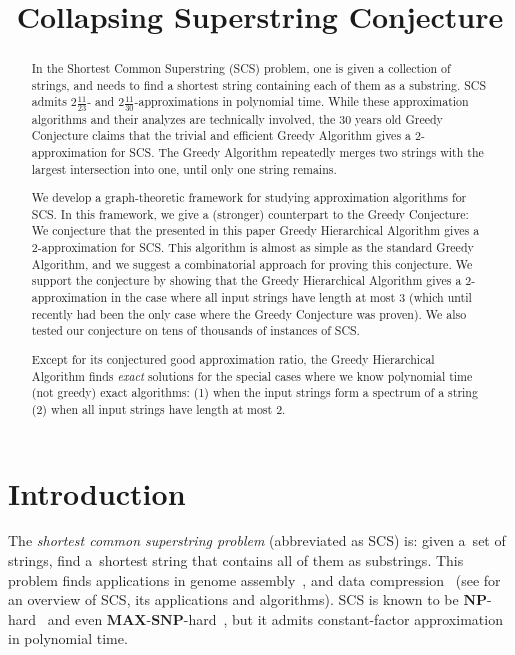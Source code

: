 \documentclass[11pt]{article}
\begin{document}
%

\sloppy
\date{}
\title{Collapsing Superstring Conjecture}
\author{}
\maketitle

\begin{abstract}
In the Shortest Common Superstring (SCS) problem, one is given a collection of strings, and needs to find a shortest string containing each of them as a substring. SCS admits $2\frac{11}{23}$- and $2\frac{11}{30}$-approximations in polynomial time. While these approximation algorithms and their analyzes are technically involved, the $30$ years old Greedy Conjecture claims that the trivial and efficient Greedy Algorithm gives a $2$-approximation for SCS. The Greedy Algorithm repeatedly merges two strings with the largest intersection into one, until only one string remains.

We develop a graph-theoretic framework for studying approximation algorithms for SCS. In this framework, we give a (stronger) counterpart to the Greedy Conjecture: We conjecture that the presented in this paper Greedy Hierarchical Algorithm gives a $2$-approximation for SCS. This algorithm is almost as simple as the standard Greedy Algorithm, and we suggest a combinatorial approach for proving this conjecture. We support the conjecture by showing that the Greedy Hierarchical Algorithm gives a $2$-approximation in the case where all input strings have length at most $3$ (which until recently had been the only case where the Greedy Conjecture was proven). We also tested our conjecture on tens of thousands of instances of SCS.

Except for its conjectured good approximation ratio, the Greedy Hierarchical Algorithm finds \emph{exact} solutions for the special cases where we know polynomial time (not greedy) exact algorithms: (1) when the input strings form a spectrum of a string (2) when all input strings have length at most $2$.
\end{abstract}


\section{Introduction}
\label{sec:intro}
The {\em shortest common superstring problem} (abbreviated as SCS) is:
given a~set of strings, find a~shortest string that contains all of them as
substrings. This problem finds applications in genome assembly~\cite{waterman1995introduction, pevzner2001eulerian}, and data compression~\cite{GMS1980, phdthesis, storer1987data} (see \cite{gevezes2014shortest, mucha2007tutorial} for an overview of SCS, its applications and algorithms).  SCS is known to be $\mathbf{NP}$-hard~\cite{GMS1980} and even $\mathbf{MAX}$-$\mathbf{SNP}$-hard~\cite{BJLTY1991}, but it admits constant-factor approximation in polynomial time.
\end{document}
